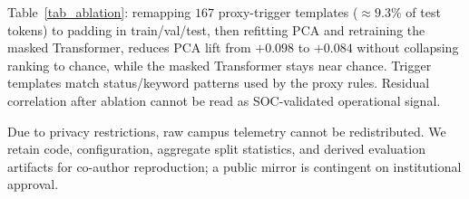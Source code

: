 \documentclass[a4paper]{llncs}
\renewcommand{\arraystretch}{0.95}
\begin{document}
Table~\ref{tab_ablation}: remapping $167$ proxy-trigger templates ($\approx9.3\%$ of test tokens) to padding in train/val/test, then refitting PCA and retraining the masked Transformer, reduces PCA lift from $+0.098$ to $+0.084$ without collapsing ranking to chance, while the masked Transformer stays near chance. Trigger templates match status/keyword patterns used by the proxy rules. Residual correlation after ablation cannot be read as SOC-validated operational signal.

Due to privacy restrictions, raw campus telemetry cannot be redistributed. We retain code, configuration, aggregate split statistics, and derived evaluation artifacts for co-author reproduction; a public mirror is contingent on institutional approval.

\begin{table}[htbp]
\caption{Protocol~A (archive-order stream-position with validation contamination): $\tau=\mu{+}3\sigma$; test prevalence $80.5\%$; always-anomaly F1 baseline$\approx0.892$; AUPRC no-skill$\approx0.805$}
\label{tab_accuracy}
\centering
\setlength{\tabcolsep}{2.2pt}
\renewcommand{\arraystretch}{0.85}
\end{table}
\end{document}
